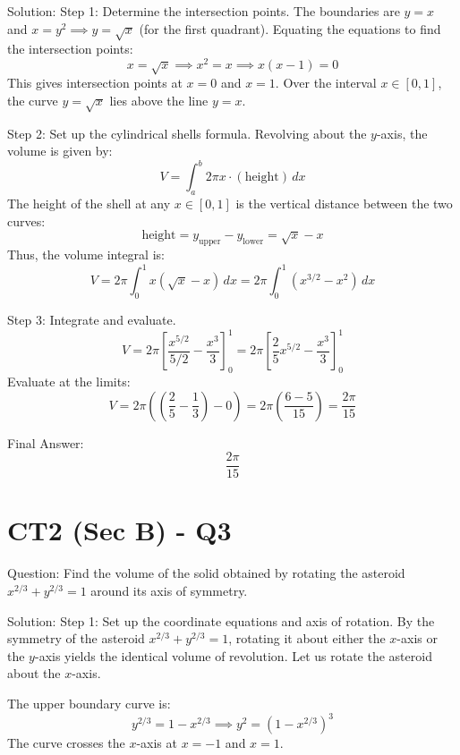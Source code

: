 \documentclass{article}
\begin{document}
Solution:
Step 1: Determine the intersection points.
The boundaries are $y = x$ and $x = y^2 \implies y = \sqrt{x}$ (for the first quadrant).
Equating the equations to find the intersection points:
\[
x = \sqrt{x} \implies x^2 = x \implies x(x-1) = 0
\]
This gives intersection points at $x = 0$ and $x = 1$.
Over the interval $x \in [0, 1]$, the curve $y = \sqrt{x}$ lies above the line $y = x$.

Step 2: Set up the cylindrical shells formula.
Revolving about the $y$-axis, the volume is given by:
\[
V = \int_{a}^{b} 2\pi x \cdot (\text{height}) \, dx
\]
The height of the shell at any $x \in [0, 1]$ is the vertical distance between the two curves:
\[
\text{height} = y_{\text{upper}} - y_{\text{lower}} = \sqrt{x} - x
\]
Thus, the volume integral is:
\[
V = 2\pi \int_{0}^{1} x (\sqrt{x} - x) \, dx = 2\pi \int_{0}^{1} (x^{3/2} - x^2) \, dx
\]

Step 3: Integrate and evaluate.
\[
V = 2\pi \left[ \frac{x^{5/2}}{5/2} - \frac{x^3}{3} \right]_{0}^{1} = 2\pi \left[ \frac{2}{5} x^{5/2} - \frac{x^3}{3} \right]_{0}^{1}
\]
Evaluate at the limits:
\[
V = 2\pi \left( \left(\frac{2}{5} - \frac{1}{3}\right) - 0 \right) = 2\pi \left( \frac{6 - 5}{15} \right) = \frac{2\pi}{15}
\]

Final Answer:
\[
\boxed{\frac{2\pi}{15}}
\]

\section*{CT2 (Sec B) - Q3}
Question:
Find the volume of the solid obtained by rotating the asteroid $x^{2/3} + y^{2/3} = 1$ around its axis of symmetry.

Solution:
Step 1: Set up the coordinate equations and axis of rotation.
By the symmetry of the asteroid $x^{2/3} + y^{2/3} = 1$, rotating it about either the $x$-axis or the $y$-axis yields the identical volume of revolution. Let us rotate the asteroid about the $x$-axis.

The upper boundary curve is:
\[
y^{2/3} = 1 - x^{2/3} \implies y^2 = (1 - x^{2/3})^3
\]
The curve crosses the $x$-axis at $x = -1$ and $x = 1$.
\end{document}

